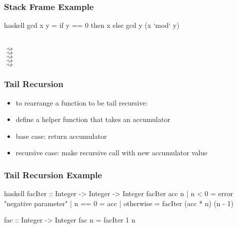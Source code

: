 \documentclass[dvipsnames]{beamer}
\theoremstyle{plain}
\begin{document}
\begin{frame}[fragile]
  \frametitle{Stack Frame Example}

  \begin{exampleblock}{}
    \begin{pygments}{haskell}
gcd x y = if y == 0 then x else gcd y (x `mod` y)
    \end{pygments}

    \\
    $\rightsquigarrow$ \\
    $\rightsquigarrow$ \\
    $\rightsquigarrow$ \\
    $\rightsquigarrow$ \\
    $\rightsquigarrow$ \\
  \end{exampleblock}
\end{frame}

\begin{frame}
  \frametitle{Tail Recursion}

  \begin{itemize}
    \item to rearrange a function to be tail recursive:

    \medskip
    \item define a helper function that takes an \alert{accumulator}
    \item base case: return accumulator
    \item recursive case: make recursive call with new accumulator value
  \end{itemize}
\end{frame}

\begin{frame}[fragile]
  \frametitle{Tail Recursion Example}

  \begin{exampleblock}{}
    \begin{pygments}{haskell}
facIter :: Integer -> Integer -> Integer
facIter acc n
  | n < 0     = error "negative parameter"
  | n == 0    = acc
  | otherwise = facIter (acc * n) (n - 1)

fac :: Integer -> Integer
fac n = facIter 1 n
    \end{pygments}
  \end{exampleblock}
\end{frame}
\end{document}
